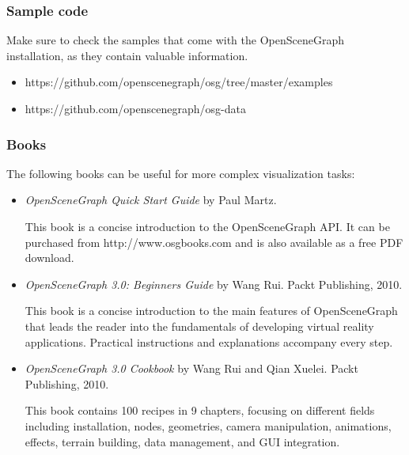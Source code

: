 \subsubsection{Sample code}
\label{sec:graphics:osg-osgearth-samples}

Make sure to check the samples that come with the OpenSceneGraph installation,
as they contain valuable information.

\begin{itemize}
\item https://github.com/openscenegraph/osg/tree/master/examples
\item https://github.com/openscenegraph/osg-data
\end{itemize}

\subsubsection{Books}
\label{sec:graphics:osg-osgearth-books}

The following books can be useful for more complex visualization tasks:

\begin{itemize}
\item \textit{OpenSceneGraph Quick Start Guide} by Paul Martz.

This book is a concise introduction to the OpenSceneGraph API. It can be
purchased from http://www.osgbooks.com and is also available as a free PDF
download.

\item \textit{OpenSceneGraph 3.0: Beginners Guide} by Wang Rui. Packt Publishing, 2010.

This book is a concise introduction to the main features of OpenSceneGraph that
leads the reader into the fundamentals of developing virtual reality
applications. Practical instructions and explanations accompany every step.

\item \textit{OpenSceneGraph 3.0 Cookbook} by Wang Rui and Qian Xuelei. Packt Publishing, 2010.

This book contains 100 recipes in 9 chapters, focusing on different fields
including installation, nodes, geometries, camera manipulation, animations,
effects, terrain building, data management, and GUI integration.

\end{itemize}


